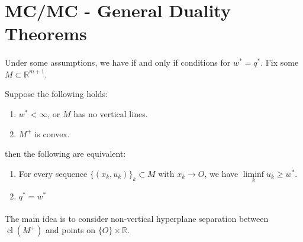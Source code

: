 \section{MC/MC - General Duality Theorems}
\label{sect:032}

\paragraph{}Under some assumptions, we have if and only if conditions for $w^\ast=q^\ast$. Fix some $M\subset \mathbb{R}^{m+1}$.

\begin{prop}\label{prop:032-strong-duality}
	Suppose the following holds:
	\begin{enumerate}[label=(\alph*)]
		\item $w^\ast<\infty$, or $M$ has no vertical lines.
		\item $M^+$ is convex.
	\end{enumerate}
	then the following are equivalent:
	\begin{enumerate}[label=(\arabic*)]
		\item For every sequence $\{(x_k,u_k)\}_{k}\subset M$ with $x_k\to O$, we have $\underset{k}{\operatorname{liminf}}u_k\geq w^\ast$.
		\item $q^\ast=w^\ast$
	\end{enumerate}
\end{prop}

\paragraph{}The main idea is to consider non-vertical hyperplane separation between $\operatorname{cl}(M^+)$ and points on $\{O\}\times \mathbb{R}$.

